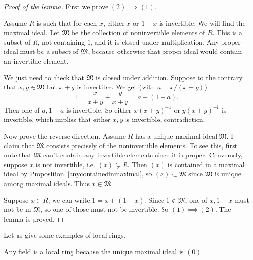 \begin{proof}[Proof of the lemma] 
First we prove $(2) \implies (1)$.

Assume $R$ is such that for
each $x$, either $x$ or $1-x$ is invertible.  We will find the maximal ideal.
Let $\mathfrak{M} $ be the collection of noninvertible elements of $R$. This is
a subset of $R$, not containing $1$,  and it is closed under multiplication.
Any proper ideal must be a subset of $\mathfrak{M}$, because otherwise that
proper ideal would contain an invertible element.  

We just need to check that $\mathfrak{M}$ is closed under addition.  Suppose to the
contrary that $x, y \in \mathfrak{M}$ but $x+y$ is invertible.   We get (with
$a = x/(x+y)$)
\[ 1 = \frac{x}{x+y} + \frac{y}{x+y} =a+(1-a). \]
Then one of $a,1-a$ is invertible. So either $x(x+y)^{-1}$  or $y(x+y)^{-1}$ is
invertible, which implies that either $x,y$ is invertible, contradiction.

Now prove the reverse direction. Assume $R$ has a unique maximal ideal
$\mathfrak{M}$.  I claim that $\mathfrak{M}$ consists precisely of the
noninvertible elements.  To see this, first note that $\mathfrak{M}$
can't contain any invertible elements since it is proper.  Conversely, suppose
$x$ is not invertible, i.e. $(x) \subsetneq R$.  Then $(x)$ is contained in a
maximal ideal by Proposition~\ref{anycontainedinmaximal},  so $(x) \subset
\mathfrak{M}$ since $\mathfrak{M}$ is unique among maximal ideals.
Thus $x \in \mathfrak{M}$.  

Suppose $x \in R$; we can write $1 = x + (1-x)$. Since $1 \notin \mathfrak{M}$,
one of $x, 1-x$ must not be in $\mathfrak{M}$, so one of those must not be
invertible. So $(1) \implies (2)$.   The lemma is proved.
\end{proof} 

Let us give some examples of local rings.

\begin{example} 
Any field is a local ring because the unique maximal ideal is $(0)$.
\end{example} 

